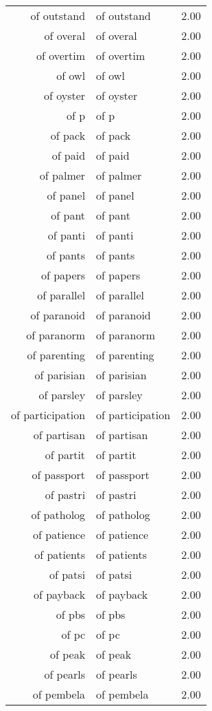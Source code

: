 \begin{table}[ht]
\begin{tabular}{rlr}
  of outstand & of outstand & 2.00 \\ 
  of overal & of overal & 2.00 \\ 
  of overtim & of overtim & 2.00 \\ 
  of owl & of owl & 2.00 \\ 
  of oyster & of oyster & 2.00 \\ 
  of p & of p & 2.00 \\ 
  of pack & of pack & 2.00 \\ 
  of paid & of paid & 2.00 \\ 
  of palmer & of palmer & 2.00 \\ 
  of panel & of panel & 2.00 \\ 
  of pant & of pant & 2.00 \\ 
  of panti & of panti & 2.00 \\ 
  of pants & of pants & 2.00 \\ 
  of papers & of papers & 2.00 \\ 
  of parallel & of parallel & 2.00 \\ 
  of paranoid & of paranoid & 2.00 \\ 
  of paranorm & of paranorm & 2.00 \\ 
  of parenting & of parenting & 2.00 \\ 
  of parisian & of parisian & 2.00 \\ 
  of parsley & of parsley & 2.00 \\ 
  of participation & of participation & 2.00 \\ 
  of partisan & of partisan & 2.00 \\ 
  of partit & of partit & 2.00 \\ 
  of passport & of passport & 2.00 \\ 
  of pastri & of pastri & 2.00 \\ 
  of patholog & of patholog & 2.00 \\ 
  of patience & of patience & 2.00 \\ 
  of patients & of patients & 2.00 \\ 
  of patsi & of patsi & 2.00 \\ 
  of payback & of payback & 2.00 \\ 
  of pbs & of pbs & 2.00 \\ 
  of pc & of pc & 2.00 \\ 
  of peak & of peak & 2.00 \\ 
  of pearls & of pearls & 2.00 \\ 
  of pembela & of pembela & 2.00 \\ 

\end{tabular}
\end{table}
